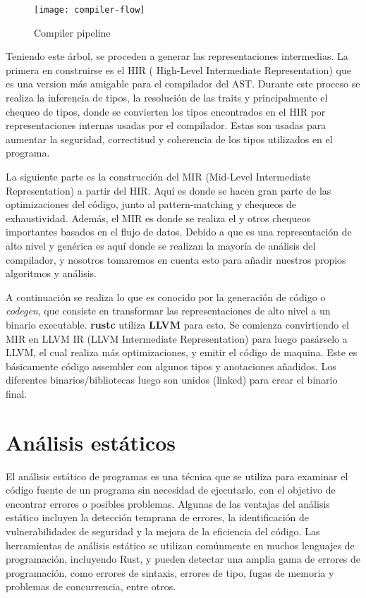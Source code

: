 \begin{wrapfigure}{r}{0.25\textwidth}
    \caption{Compiler pipeline}
    \centering
    \texttt{[image: compiler-flow]}
\end{wrapfigure}

Teniendo este árbol, se proceden a generar las representaciones intermedias. La primera en construirse es el HIR ( High-Level Intermediate Representation) que es una version más amigable para el compilador del AST. Durante este proceso se realiza la inferencia de tipos, la resolución de las traits y principalmente el chequeo de tipos, donde se convierten los tipos encontrados en el HIR por representaciones internas usadas por el compilador. Estas son usadas para aumentar la seguridad, correctitud y coherencia de los tipos utilizados en el programa.

La siguiente parte es la construcción del MIR (Mid-Level Intermediate Representation) a partir del HIR. Aquí es donde se hacen gran parte de las optimizaciones del código, junto al pattern-matching y chequeos de exhaustividad. Además, el MIR es donde se realiza el  y otros chequeos importantes basados en el flujo de datos. Debido a que es una representación de alto nivel y genérica es aquí donde se realizan la mayoría de análisis del compilador, y nosotros tomaremos en cuenta esto para añadir nuestros propios algoritmos y análisis.

A continuación se realiza lo que es conocido por la generación de código o \textit{codegen}, que consiste en transformar las representaciones de alto nivel a un binario executable. \textbf{rustc} utiliza \textbf{LLVM} para esto. Se comienza convirtiendo el MIR en LLVM IR (LLVM Intermediate Representation) para luego pasárselo a LLVM, el cual realiza más optimizaciones, y emitir el código de maquina. Este es básicamente código assembler con algunos tipos y anotaciones añadidos. Los diferentes binarios/bibliotecas luego son unidos (linked) para crear el binario final.

\section{Análisis estáticos}

El análisis estático de programas es una técnica que se utiliza para examinar el código fuente de un programa sin necesidad de ejecutarlo, con el objetivo de encontrar errores o posibles problemas. Algunas de las ventajas del análisis estático incluyen la detección temprana de errores, la identificación de vulnerabilidades de seguridad y la mejora de la eficiencia del código. Las herramientas de análisis estático se utilizan comúnmente en muchos lenguajes de programación, incluyendo Rust, y pueden detectar una amplia gama de errores de programación, como errores de sintaxis, errores de tipo, fugas de memoria y problemas de concurrencia, entre otros.

